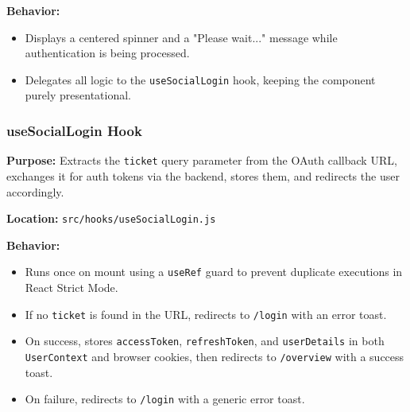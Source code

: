 \vspace{0.2cm}
\noindent\textbf{Behavior:}
\begin{itemize}
    \item Displays a centered spinner and a "Please wait..." message while authentication is being processed.
    \item Delegates all logic to the \texttt{useSocialLogin} hook, keeping the component purely presentational.
\end{itemize}

\subsubsection{useSocialLogin Hook}

\textbf{Purpose:} Extracts the \texttt{ticket} query parameter from the OAuth callback URL, exchanges it for auth tokens via the backend, stores them, and redirects the user accordingly.

\vspace{0.2cm}
\noindent\textbf{Location:} \texttt{src/hooks/useSocialLogin.js}

\vspace{0.2cm}
\noindent\textbf{Behavior:}
\begin{itemize}
    \item Runs once on mount using a \texttt{useRef} guard to prevent duplicate executions in React Strict Mode.
    \item If no \texttt{ticket} is found in the URL, redirects to \texttt{/login} with an error toast.
    \item On success, stores \texttt{accessToken}, \texttt{refreshToken}, and \texttt{userDetails} in both \texttt{UserContext} and browser cookies, then redirects to \texttt{/overview} with a success toast.
    \item On failure, redirects to \texttt{/login} with a generic error toast.
\end{itemize}

